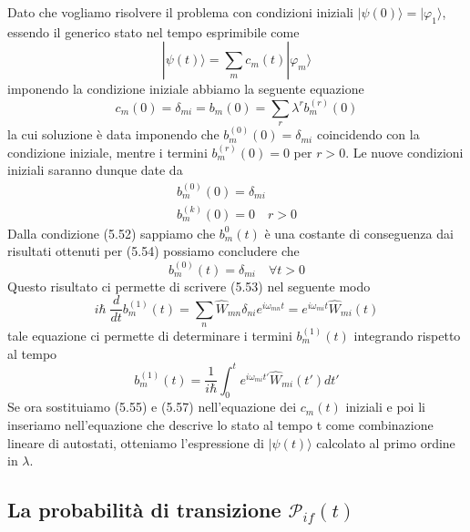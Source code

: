 Dato che vogliamo risolvere il problema con condizioni iniziali $|\psi(0) \rangle = | \varphi_1 \rangle $, essendo il generico stato nel tempo esprimibile come 
\begin{equation*}
	|\psi(t) \rangle = \sum_{m}c_m(t)|\varphi_m \rangle
\end{equation*}
imponendo la condizione iniziale abbiamo la seguente equazione
\begin{equation}
	c_m(0) = \delta_{mi} = b_{m}(0) = \sum_{r} \lambda^r b_{m}^{(r)}(0)  
\end{equation}	
 la cui soluzione \`e data imponendo che $b_m^{(0)}(0) = \delta_{mi}$ coincidendo con la condizione iniziale, mentre i termini $b_m^{(r)}(0)=0$ per $r > 0$. Le nuove condizioni iniziali saranno dunque date da
 \begin{equation*}
 	\begin{array}{l}
 		b_m^{(0)}(0) = \delta_{mi} \\[0.3cm]
 		b_m^{(k)}(0) = 0  \quad r>0
 	\end{array}
 \end{equation*}
Dalla condizione (5.52) sappiamo che $b_m^{0}(t)$ \`e una costante di conseguenza dai risultati ottenuti per (5.54) possiamo concludere che
\begin{equation}
	b_m^{(0)}(t) = \delta_{mi} \quad \forall t > 0
\end{equation}
Questo risultato ci permette di scrivere (5.53) nel seguente modo
\begin{equation}
	i\hbar \; \frac{d}{dt} b_m^{(1)}(t) = \sum_{n}\hat{W}_{mn}\delta_{ni}e^{i \omega_{mn}t} =e^{i \omega_{mi}t} \hat{W}_{mi}(t) 
\end{equation}
tale equazione ci permette di determinare i termini $b^{(1)}_{m}(t)$ integrando rispetto al tempo
\begin{equation}
	b_m^{(1)}(t) = \frac{1}{i \hbar} \int_{0}^{t} e^{i \omega_{mi}t'}\hat{W}_{mi}(t')dt'
\end{equation}
Se ora sostituiamo (5.55) e (5.57) nell'equazione dei $c_m(t)$ iniziali e poi li inseriamo nell'equazione che descrive lo stato al tempo t come combinazione lineare di autostati, otteniamo l'espressione di $|\psi(t) \rangle $ calcolato al primo ordine in $\lambda$.

\subsection{La probabilit\`a di transizione $\mathcal{P}_{if}(t)$}

